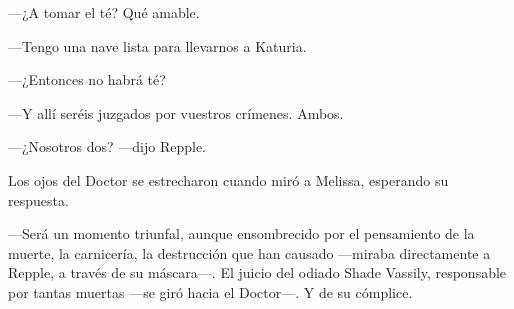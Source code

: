 {---¿A tomar el té? Qué amable.}

{---Tengo una nave lista para llevarnos a Katuria.}

{---¿Entonces no habrá té?}

{---Y allí seréis juzgados por vuestros crímenes. Ambos.}

{---¿Nosotros dos? ---dijo Repple.}

{Los ojos del Doctor se estrecharon cuando miró a Melissa, esperando su
respuesta.}

{---Será un momento triunfal, aunque ensombrecido por el pensamiento de
	la muerte, la carnicería, la destrucción que han causado ---miraba
	directamente a Repple, a través de su máscara---. El juicio del odiado
	Shade Vassily, responsable por tantas muertas ---se giró hacia el
Doctor---. Y de su cómplice.}
